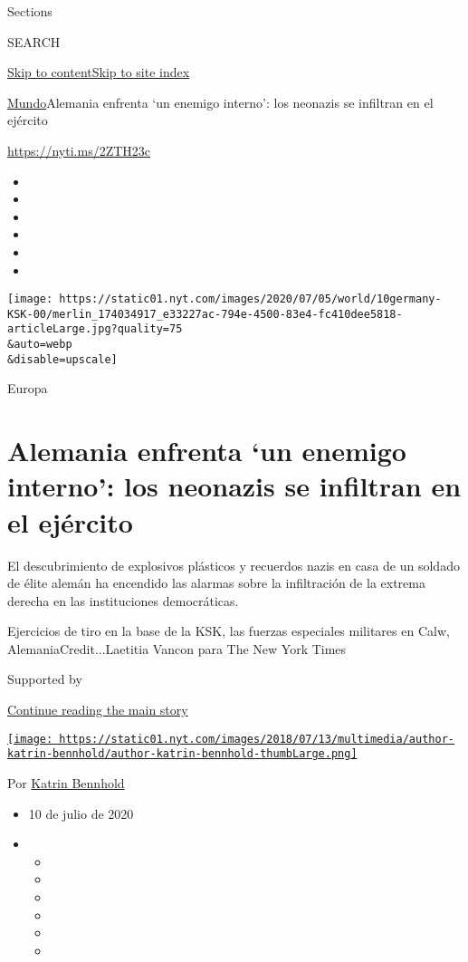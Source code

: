 Sections

SEARCH

\protect\hyperlink{site-content}{Skip to
content}\protect\hyperlink{site-index}{Skip to site index}

\href{/es/section/mundo}{Mundo}\textbar{}Alemania enfrenta `un enemigo
interno': los neonazis se infiltran en el ejército

\url{https://nyti.ms/2ZTH23c}

\begin{itemize}
\item
\item
\item
\item
\item
\item
\end{itemize}

\texttt{[image: https://static01.nyt.com/images/2020/07/05/world/10germany-KSK-00/merlin\_174034917\_e33227ac-794e-4500-83e4-fc410dee5818-articleLarge.jpg?quality=75\\\&auto=webp\\\&disable=upscale]}

Europa

\hypertarget{alemania-enfrenta-un-enemigo-interno-los-neonazis-se-infiltran-en-el-ejuxe9rcito}{%
\section{Alemania enfrenta `un enemigo interno': los neonazis se
infiltran en el
ejército}\label{alemania-enfrenta-un-enemigo-interno-los-neonazis-se-infiltran-en-el-ejuxe9rcito}}

El descubrimiento de explosivos plásticos y recuerdos nazis en casa de
un soldado de élite alemán ha encendido las alarmas sobre la
infiltración de la extrema derecha en las instituciones democráticas.

Ejercicios de tiro en la base de la KSK, las fuerzas especiales
militares en Calw, AlemaniaCredit...Laetitia Vancon para The New York
Times

Supported by

\protect\hyperlink{after-sponsor}{Continue reading the main story}

\href{https://www.nytimes.com/by/katrin-bennhold}{\texttt{[image: https://static01.nyt.com/images/2018/07/13/multimedia/author-katrin-bennhold/author-katrin-bennhold-thumbLarge.png]}}

Por \href{https://www.nytimes.com/by/katrin-bennhold}{Katrin Bennhold}

\begin{itemize}
\item
  10 de julio de 2020
\item
  \begin{itemize}
  \item
  \item
  \item
  \item
  \item
  \item
  \end{itemize}
\end{itemize}

